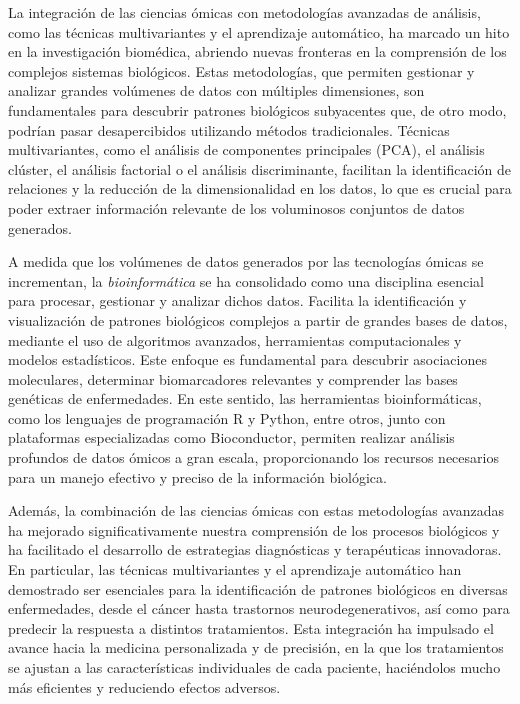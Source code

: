 La integración de las ciencias ómicas con metodologías avanzadas de análisis, como las técnicas multivariantes 
y el aprendizaje automático, ha marcado un hito en la investigación biomédica, abriendo nuevas fronteras en la 
comprensión de los complejos sistemas biológicos. Estas metodologías, que permiten gestionar y analizar grandes 
volúmenes de datos con múltiples dimensiones, son fundamentales para descubrir patrones biológicos subyacentes 
que, de otro modo, podrían pasar desapercibidos utilizando métodos tradicionales\cite{tarca}. Técnicas multivariantes, como 
el análisis de componentes principales (PCA), el análisis clúster, el análisis factorial o el análisis discriminante, 
facilitan la identificación de relaciones y la reducción de la dimensionalidad en los datos, lo que es crucial para 
poder extraer información relevante de los voluminosos conjuntos de datos generados\cite{intro-1}.\newline

A medida que los volúmenes de datos generados por las tecnologías ómicas se incrementan, la \textit{bioinformática} se ha 
consolidado como una disciplina esencial para procesar, gestionar y analizar dichos datos\cite{kaneshia}. Facilita la identificación y 
visualización de patrones biológicos complejos a partir de grandes bases de datos, mediante el uso de algoritmos avanzados,
herramientas computacionales y modelos estadísticos. Este enfoque es fundamental para descubrir asociaciones moleculares, 
determinar biomarcadores relevantes y comprender las bases genéticas de enfermedades\cite{koh}. En este sentido, las herramientas
bioinformáticas, como los lenguajes de programación R y Python, entre otros, junto con plataformas especializadas como Bioconductor, 
permiten realizar análisis profundos de datos ómicos a gran escala, proporcionando los recursos necesarios para un 
manejo efectivo y preciso de la información biológica\cite{bioconductor-1}. \newline

Además, la combinación de las ciencias ómicas con estas metodologías avanzadas ha mejorado significativamente 
nuestra comprensión de los procesos biológicos y ha facilitado el desarrollo de estrategias diagnósticas y terapéuticas 
innovadoras. En particular, las técnicas multivariantes y el aprendizaje automático han demostrado ser esenciales 
para la identificación de patrones biológicos en diversas enfermedades, desde el cáncer hasta trastornos neurodegenerativos, 
así como para predecir la respuesta a distintos tratamientos. Esta integración ha impulsado el avance hacia la medicina 
personalizada y de precisión, en la que los tratamientos se ajustan a las características individuales de cada paciente, 
haciéndolos mucho más eficientes y reduciendo efectos adversos. \newline

